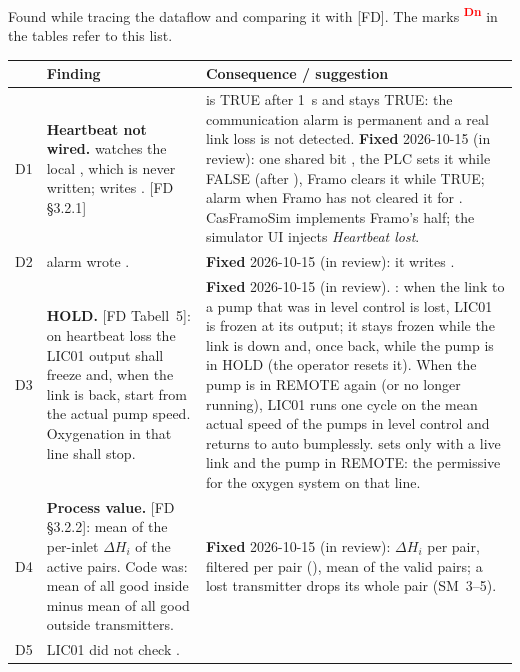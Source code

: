 \documentclass[11pt]{article}
\newcommand{\dev}[1]{\textsuperscript{\textcolor{red}{\textbf{D#1}}}}
\begin{document}
Found while tracing the dataflow and comparing it with [FD]. The marks \dev{n} in the tables refer
to this list.

\begin{longtable}{@{}lP{66mm}P{80mm}@{}}
\toprule
& Finding & Consequence / suggestion \\
\midrule
\endhead
\bottomrule
\endfoot
D1 & \textbf{Heartbeat not wired.}  watches the local
  , which is never written;  writes
  . [FD \S3.2.1] &
   is TRUE after 1~s and stays TRUE: the communication alarm is
  permanent and a real link loss is not detected. \textbf{Fixed} 2026-10-15 (in review): one
  shared bit , the PLC sets it while FALSE (after
  ), Framo clears it while TRUE; alarm when Framo has not cleared
  it for . CasFramoSim implements Framo's half; the simulator UI
  injects \emph{Heartbeat lost}. \\
D2 &  alarm wrote . &
  \textbf{Fixed} 2026-10-15 (in review): it writes . \\
D3 & \textbf{HOLD.} [FD Tabell~5]: on heartbeat loss the LIC01 output shall freeze and, when the
  link is back, start from the actual pump speed. Oxygenation in that line shall stop. &
  \textbf{Fixed} 2026-10-15 (in review). : when the link to a pump that was in
  level control is lost, LIC01 is frozen at its output; it stays frozen while the link is down and,
  once back, while the pump is in HOLD (the operator resets it). When the pump is in REMOTE again (or
  no longer running), LIC01 runs one cycle on the mean actual speed of the pumps in level control and
  returns to auto bumplessly.  sets  only with a live
  link and the pump in REMOTE: the permissive for the oxygen system on that line. \\
D4 & \textbf{Process value.} [FD \S3.2.2]: mean of the per-inlet $\Delta H_i$ of the active
  pairs. Code was: mean of all good inside minus mean of all good outside transmitters. &
  \textbf{Fixed} 2026-10-15 (in review): $\Delta H_i$ per pair, filtered per pair
  (), mean of the valid pairs; a lost transmitter drops its whole pair (SM~3--5). \\
D5 & LIC01 did not check . &

\end{longtable}
\end{document}

